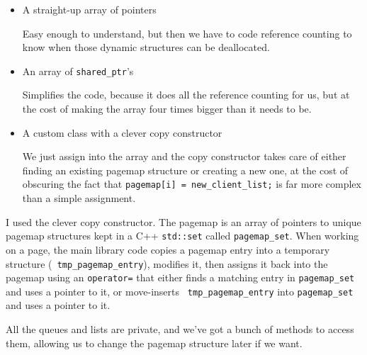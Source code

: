\documentclass{article}
\begin{document}
\begin{itemize}

\item  A straight-up array of pointers

Easy enough to understand, but then we have to
code reference counting to know when those dynamic structures can be
deallocated.

\item An array of {\tt shared_ptr}'s

Simplifies the code, because
it does all the reference counting for us, but at the cost of making
the array four times bigger than it needs to be.

\item A custom class with a clever copy constructor

We just assign into the array and the copy constructor takes care of
either finding an existing pagemap structure or creating a new one, at
the cost of obscuring the fact that {\tt pagemap[i] = new_client_list;} is
far more complex than a simple assignment.

\end{itemize}

I used the clever copy constructor.  The pagemap is an
array of pointers to unique pagemap structures kept in a C++ {\tt std::set}
called {\tt pagemap_set}.  When working on a page, the main library
code copies a pagemap entry into a temporary structure ({\tt
  tmp_pagemap_entry}), modifies it, then assigns it back into the
pagemap using an {\tt operator=} that either finds a matching entry in
{\tt pagemap_set} and uses a pointer to it, or move-inserts {\tt
  tmp_pagemap_entry} into {\tt pagemap_set} and uses a pointer to it.

All the queues and lists are private, and we've got a bunch of methods
to access them, allowing us to change the pagemap structure later if
we want.
\end{document}
